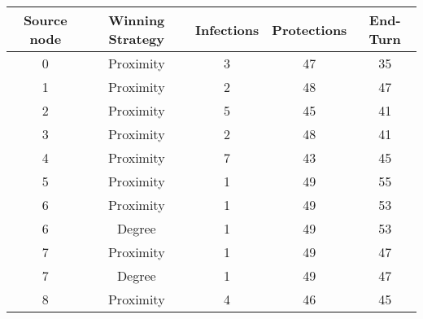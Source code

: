 \documentclass[results.tex]{subfiles}
\begin{document}
    \begin{center}
        \begin{tabular}{| c || c | c | c | c |}
            \hline
            {\bfseries Source node} & {\bfseries Winning Strategy} & {\bfseries Infections} & {\bfseries Protections}
            & {\bfseries End-Turn}
            \\  %
            \hline\hline
            0                       & Proximity                    & 3                      & 47                      & 35                   \\
            \hline
            1                       & Proximity                    & 2                      & 48                      & 47                   \\
            \hline
            2                       & Proximity                    & 5                      & 45                      & 41                   \\
            \hline
            3                       & Proximity                    & 2                      & 48                      & 41                   \\
            \hline
            4                       & Proximity                    & 7                      & 43                      & 45                   \\
            \hline
            5                       & Proximity                    & 1                      & 49                      & 55                   \\
            \hline
            6                       & Proximity                    & 1                      & 49                      & 53                   \\
            \hline
            6                       & Degree                       & 1                      & 49                      & 53                   \\
            \hline
            7                       & Proximity                    & 1                      & 49                      & 47                   \\
            \hline
            7                       & Degree                       & 1                      & 49                      & 47                   \\
            \hline
            8                       & Proximity                    & 4                      & 46                      & 45                   \\

\end{tabular}
\end{center}
\end{document}

